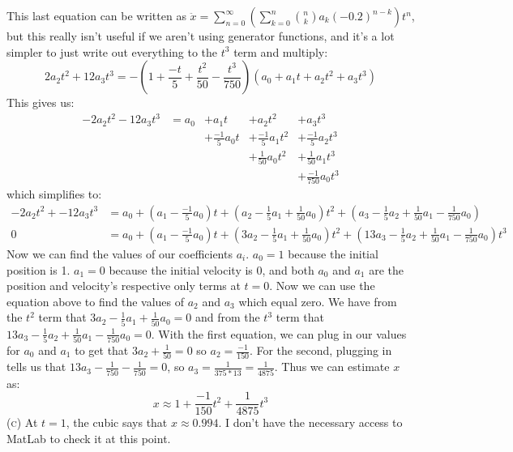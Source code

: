 \documentclass{article}
\begin{document}
This last equation can be written as $\displaystyle\ddot{x} = \sum_{n=0}^\infty\left( \sum_{k=0}^n \binom{n}{k} a_k (-0.2)^{n-k} \right)t^n$, but this really isn't useful if we aren't using generator functions, and it's a lot simpler to just write out everything to the $t^3$ term and multiply:
\[
2a_2t^2 + 12a_3t^3 = -\left( 1 + \frac{-t}{5} + \frac{t^2}{50} - \frac{t^3}{750} \right) \left( a_0 + a_1t + a_2t^2 + a_3t^3 \right)
\]
This gives us:
\[
\begin{array}{cllll}
    -2a_2t^2 - 12a_3t^3 &= a_0 &+ a_1t &+ a_2t^2 &+ a_3t^3 \\
    & &+ \frac{-1}{5}a_0t &+ \frac{-1}{5}a_1t^2 &+ \frac{-1}{5}a_2t^3 \\
    & & &+ \frac{1}{50}a_0t^2 &+ \frac{1}{50}a_1t^3 \\
    & & & &+ \frac{-1}{750}a_0t^3
\end{array}
\]
which simplifies to:
\begin{align*}
    -2a_2t^2 + -12a_3t^3 &= a_0 + \left(a_1 - \frac{-1}{5}a_0\right)t + \left(a_2 - \frac{1}{5}a_1 + \frac{1}{50}a_0\right)t^2 + \left( a_3 - \frac{1}{5}a_2 + \frac{1}{50}a_1 - \frac{1}{750}a_0 \right) \\
    0 &= a_0 + \left(a_1 - \frac{-1}{5}a_0\right)t + \left(3a_2 - \frac{1}{5}a_1 + \frac{1}{50}a_0\right)t^2 + \left( 13a_3 - \frac{1}{5}a_2 + \frac{1}{50}a_1 - \frac{1}{750}a_0 \right)t^3
\end{align*}
Now we can find the values of our coefficients $a_i$.  $a_0 = 1$ because the initial position is 1.  $a_1 = 0$ because the initial velocity is 0, and both $a_0$ and $a_1$ are the position and velocity's respective only terms at $t = 0$.  Now we can use the equation above to find the values of $a_2$ and $a_3$ which equal zero.  We have from the $t^2$ term that $3a_2 - \frac{1}{5}a_1 + \frac{1}{50}a_0 = 0$ and from the $t^3$ term that $13a_3 - \frac{1}{5}a_2 + \frac{1}{50}a_1 - \frac{1}{750}a_0 = 0$.  With the first equation, we can plug in our values for $a_0$ and $a_1$ to get that $3a_2 +\frac{1}{50} = 0$ so $a_2 = \frac{-1}{150}$.  For the second, plugging in tells us that $13a_3 - \frac{1}{750} -\frac{1}{750} = 0$, so $a_3 = \frac{1}{375*13} = \frac{1}{4875}$.  Thus we can estimate $x$ as:
\[
x \approx 1 + \frac{-1}{150}t^2 +\frac{1}{4875}t^3
\]
\textsc{(c)} At $t=1$, the cubic says that $x \approx 0.994$.  I don't have the necessary access to MatLab to check it at this point.

\end{document}
